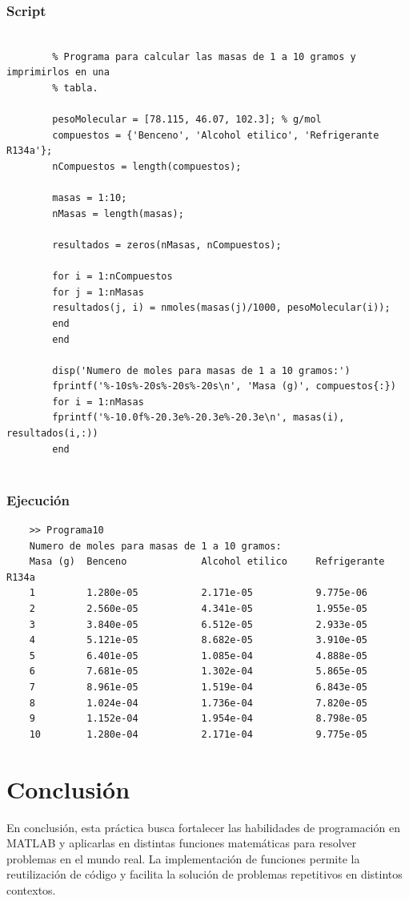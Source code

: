 \documentclass{article}
\begin{document}
	\newpage
	\subsubsection{Script}
	
	\begin{lstlisting}
		
		% Programa para calcular las masas de 1 a 10 gramos y imprimirlos en una
		% tabla.
		
		pesoMolecular = [78.115, 46.07, 102.3]; % g/mol
		compuestos = {'Benceno', 'Alcohol etilico', 'Refrigerante R134a'};
		nCompuestos = length(compuestos);
		
		masas = 1:10;
		nMasas = length(masas);
		
		resultados = zeros(nMasas, nCompuestos);
		
		for i = 1:nCompuestos
		for j = 1:nMasas
		resultados(j, i) = nmoles(masas(j)/1000, pesoMolecular(i));
		end
		end
		
		disp('Numero de moles para masas de 1 a 10 gramos:')
		fprintf('%-10s%-20s%-20s%-20s\n', 'Masa (g)', compuestos{:})
		for i = 1:nMasas
		fprintf('%-10.0f%-20.3e%-20.3e%-20.3e\n', masas(i), resultados(i,:))
		end
		
	\end{lstlisting}
	
	\subsubsection{Ejecución}
	
	\begin{lstlisting}
	>> Programa10
	Numero de moles para masas de 1 a 10 gramos:
	Masa (g)  Benceno             Alcohol etilico     Refrigerante R134a  
	1         1.280e-05           2.171e-05           9.775e-06           
	2         2.560e-05           4.341e-05           1.955e-05           
	3         3.840e-05           6.512e-05           2.933e-05           
	4         5.121e-05           8.682e-05           3.910e-05           
	5         6.401e-05           1.085e-04           4.888e-05           
	6         7.681e-05           1.302e-04           5.865e-05           
	7         8.961e-05           1.519e-04           6.843e-05           
	8         1.024e-04           1.736e-04           7.820e-05           
	9         1.152e-04           1.954e-04           8.798e-05           
	10        1.280e-04           2.171e-04           9.775e-05  
	\end{lstlisting}
	
	\newpage
	\section{Conclusión}
	
	En conclusión, esta práctica busca fortalecer las habilidades de programación en MATLAB y aplicarlas en distintas funciones matemáticas para resolver problemas en el mundo real. La implementación de funciones permite la reutilización de código y facilita la solución de problemas repetitivos en distintos contextos.
	
\end{document}
